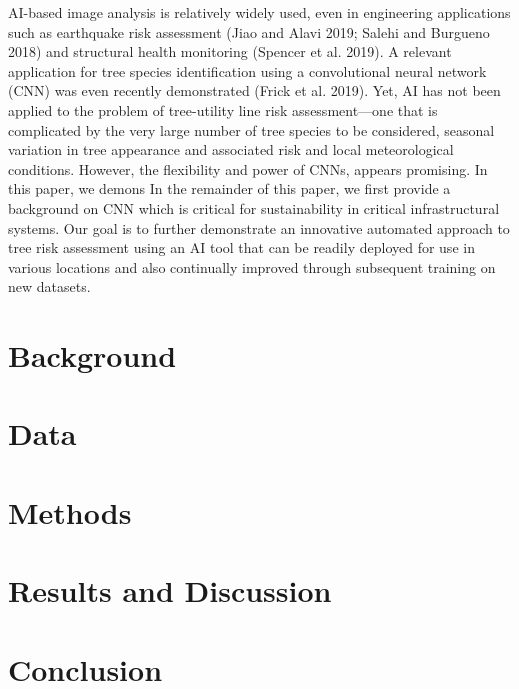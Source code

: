 \documentclass[11pt,twoside]{article}
\numberwithin{equation}{section}
\newcommand{\?}{\stackrel{?}{=}}
\begin{document}
AI-based image analysis is relatively widely used, even in engineering applications such as earthquake risk assessment (Jiao and Alavi 2019; Salehi and Burgueno 2018) and structural health monitoring (Spencer et al. 2019). A relevant application for tree species identification using a convolutional neural network (CNN) was even recently demonstrated (Frick et al. 2019). Yet, AI has not been applied to the problem of tree-utility line risk assessment---one that is complicated by the very large number of tree species to be considered, seasonal variation in tree appearance and associated risk and local meteorological conditions. However, the flexibility and power of CNNs, appears promising. In this paper, we demons
In the remainder of this paper, we first provide a background on CNN
which is critical for sustainability in critical infrastructural systems. Our goal is to further demonstrate an innovative automated approach to tree risk assessment using an AI tool that can be readily deployed for use in various locations and also continually improved through subsequent training on new datasets.

\section{Background}
\section{Data}

\section{Methods}

\section{Results and Discussion}

\section{Conclusion}

\appendix
\end{document}
